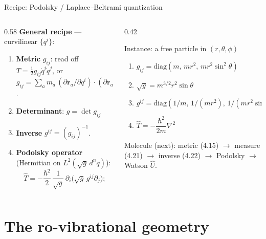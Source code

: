 \documentclass[aspectratio=169,10pt]{beamer}
\newcommand{\stagenum}{0}
\newcommand{\setstage}[1]{\renewcommand{\stagenum}{#1}}
\begin{document}
\begin{frame}{Recipe: Podolsky / Laplace--Beltrami quantization}
\setstage{3}
\small
\begin{columns}[T]
\begin{column}{0.58\textwidth}
\textbf{General recipe} --- curvilinear $\{q^i\}$:
\begin{enumerate}\setlength{\itemsep}{0pt}
\item \textbf{Metric} $g_{ij}$: read off $T=\tfrac12 g_{ij}\dot q^i\dot q^j$, or $g_{ij}=\sum_a m_a\,(\partial\mathbf r_a/\partial q^i)\!\cdot\!(\partial\mathbf r_a/\partial q^j)$.
\item \textbf{Determinant}: $g=\det g_{ij}$
\item \textbf{Inverse} $g^{ij}=(g_{ij})^{-1}$.
\item \textbf{Podolsky operator} (Hermitian on $L^2(\sqrt g\,d^nq)$):
\[ \hat T=-\frac{\hbar^2}{2}\,\frac{1}{\sqrt g}\,\partial_i\!\bigl(\sqrt g\,g^{ij}\partial_j\bigr); \]
\end{enumerate}
\end{column}
\begin{column}{0.42\textwidth}
\footnotesize
\begin{block}{Instance: a free particle in $(r,\theta,\phi)$}
\begin{enumerate}\setlength{\itemsep}{1pt}
\item $g_{ij} = \mathrm{diag}(m,\,mr^2,\,mr^2\sin^2\theta)$
\item $\sqrt g = m^{3/2}r^2\sin\theta$
\item $g^{ij} = \mathrm{diag}(1/m,\,1/(mr^2),\,1/(mr^2\sin^2\theta))$
\item $\hat T=-\dfrac{\hbar^2}{2m}\nabla^2$ \checkmark
\end{enumerate}
\end{block}
{\scriptsize Molecule (next): metric (4.15) $\to$ measure (4.21) $\to$ inverse (4.22) $\to$ Podolsky $\to$ Watson $\hat U$.}
\end{column}
\end{columns}
\end{frame}

\section{The ro-vibrational geometry}
\end{document}

